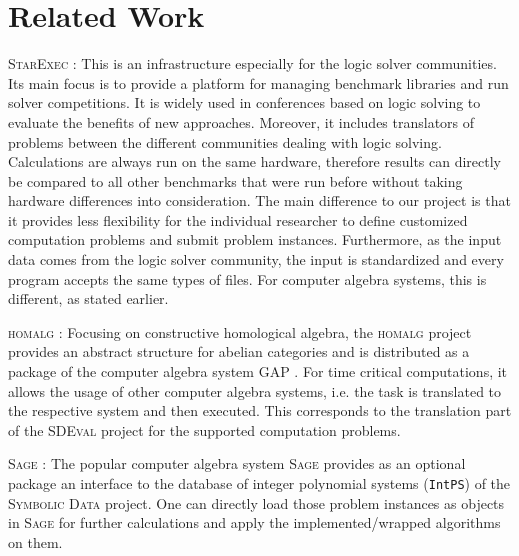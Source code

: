 \documentclass[12pt]{article}
\begin{document}

\section{Related Work}
\label{sctn:relatedWork}

\textsc{StarExec} \cite{stump2012introducing}: This is an infrastructure
especially for the logic solver communities. Its main focus is to provide a
platform for managing benchmark libraries and run solver competitions. It is
widely used in conferences based on logic solving to evaluate the benefits of
new approaches. Moreover, it includes translators of problems between the
different communities dealing with logic solving. Calculations are always run
on the same hardware, therefore results can directly be compared to all other
benchmarks that were run before without taking hardware differences into
consideration. The main difference to our project is that it provides less
flexibility for the individual researcher to define customized computation
problems and submit problem instances. Furthermore, as the input data comes
from the logic solver community, the input is standardized and every program
accepts the same types of files. For computer algebra systems, this is
different, as stated earlier.


\textsc{homalg} \cite{barakat2008homalg}: Focusing on constructive homological
algebra, the \textsc{homalg} project provides an abstract structure for abelian
categories and is distributed as a package of the computer algebra system
\textsc{GAP} \cite{GAP4}. For time critical computations, it allows the usage
of other computer algebra systems, i.e. the task is translated to the
respective system and then executed.  This corresponds to the translation part
of the \textsc{SDEval} project for the supported computation problems.

\textsc{Sage} \cite{stein2008sage}: The popular computer algebra system
\textsc{Sage} provides as an optional package an interface to the database of
integer polynomial systems (\texttt{IntPS}) of the \textsc{Symbolic Data}
project. One can directly load those problem instances as objects in
\textsc{Sage} for further calculations and apply the implemented/wrapped
algorithms on them.
\end{document}

